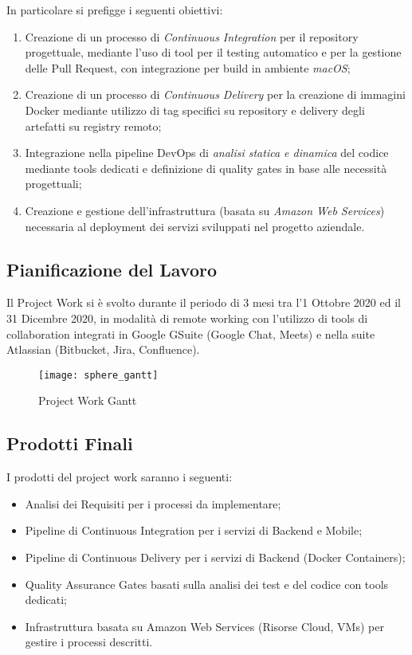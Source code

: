 \documentclass[../main.tex]{subfiles}
\begin{document}
    			In particolare si prefigge i seguenti obiettivi:
    			\begin{enumerate}
    				\item Creazione di un processo di \emph{Continuous Integration} per il repository progettuale, mediante l'uso di tool per il testing automatico e per la gestione delle Pull Request, con integrazione per build in ambiente \emph{macOS};
    				\item Creazione di un processo di \emph{Continuous Delivery} per la creazione di immagini Docker mediante utilizzo di tag specifici su repository e delivery degli artefatti su registry remoto;
    				\item Integrazione nella pipeline DevOps di \emph{analisi statica e dinamica} del codice mediante tools dedicati e definizione di quality gates in base alle necessità progettuali;
    				\item Creazione e gestione dell'infrastruttura (basata su \emph{Amazon Web Services}) necessaria al deployment dei servizi sviluppati nel progetto aziendale.
    			\end{enumerate}
    	
    		\subsection*{Pianificazione del Lavoro}
    	
    			Il Project Work si è svolto durante il periodo di 3 mesi tra l'1 Ottobre 2020 ed il 31 Dicembre 2020, in modalità di remote working con l'utilizzo di tools di collaboration integrati in Google GSuite (Google Chat, Meets) e nella suite Atlassian (Bitbucket, Jira, Confluence).
    			
    			\begin{figure}[H]
            		\centering
            		\texttt{[image: sphere\_gantt]}
            		\caption{Project Work Gantt}
            		\label{fig:sphere_gantt}
        	    \end{figure}
    	
    		\subsection*{Prodotti Finali}
    		
    			I prodotti del project work saranno i seguenti:
    			\begin{itemize}
    				\item Analisi dei Requisiti per i processi da implementare;
    				\item Pipeline di Continuous Integration per i servizi di Backend e Mobile;
    				\item Pipeline di Continuous Delivery per i servizi di Backend (Docker Containers);
    				\item Quality Assurance Gates basati sulla analisi dei test e del codice con tools dedicati;
    				\item Infrastruttura basata su Amazon Web Services (Risorse Cloud, VMs) per gestire i processi descritti.
    			\end{itemize}
\end{document}

